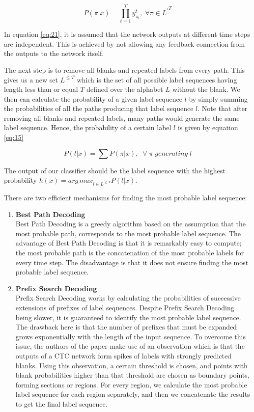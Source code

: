 \begin{equation}
\label{eq:14}
P(\pi|x) = \prod_{t=1}^{T} y_{\pi_t}^{t}, \; \forall \pi \in {{L^{'}}^T}
\end{equation}

In equation \ref{eq:21}, it is assumed that the network outputs at different time steps are independent. This is achieved by not allowing any feedback connection from the outputs to the network itself.

The next step is to remove all blanks and repeated labels from every path. This gives us a new set $L^{\leq T}$ which is the set of all possible label sequences having length less than or equal $T$ defined over the alphabet $L$ without the blank. We then can calculate the probability of a given label sequence $l$ by simply summing the probabilities of all the paths producing that label sequence $l$. Note that after removing all blanks and repeated labels, many paths would generate the same label sequence. Hence, the probability of a certain label $l$ is given by equation \ref{eq:15}

\begin{equation}
\label{eq:15}
P(l|x) = \sum P(\pi|x), \; \;  \forall \; \pi \; generating \; l
\end{equation}


The output of our classifier should be the label sequence with the highest probability $h(x) = {arg \, max}_{l \in {L^{\leq T}}} P(l|x)$.

There are two efficient mechanisms for finding the most probable label sequence:
\begin{enumerate}
	\item \textbf{Best Path Decoding} \mbox{}\\
	 Best Path Decoding is a greedy algorithm based on the assumption that the most probable path, corresponds to the most probable label sequence. The advantage of Best Path Decoding is that it is remarkably easy to compute; the most probable path is the concatenation of the most probable labels for every time step. The disadvantage is that it does not ensure finding the most probable label sequence.
	\item \textbf{Prefix Search Decoding} \mbox{}\\
	Prefix Search Decoding works by calculating the probabilities of successive extensions of prefixes of label sequences. Despite Prefix Search Decoding being slower, it is guaranteed to identify the most probable label sequence. The drawback here is that the number of prefixes that must be expanded grows exponentially with the length of the input sequence. To overcome this issue, the authors of the paper make use of an observation which is that the outputs of a \ac{CTC} network form spikes of labels with strongly predicted blanks. Using this observation, a certain threshold is chosen, and points with blank probabilities higher than that threshold are chosen as boundary points, forming sections or regions. For every region, we calculate the most probable label sequence for each region separately, and then we concatenate the results to get the final label sequence. 
\end{enumerate} 


